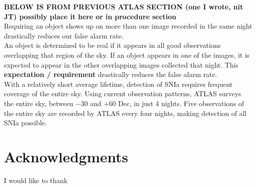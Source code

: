 \documentclass[aps,prb,twocolumn,superscriptaddress]{revtex4-1}
\begin{document}
{\bf \noindent BELOW IS FROM PREVIOUS ATLAS SECTION (one I wrote, nit JT)
\indent possibly place it here or in procedure section}\\
Requiring an object shows up on more than one image recorded in the same night 
drastically reduces our false alarm rate.\\
An object is determined to be real if it appears in all good 
observations overlapping that region of the sky. 
If an object appears in one of the images, it is expected to appear 
in the other overlapping images collected that night.
This {\bf expectation / requirement} drastically reduces the false alarm rate.\\
\indent With a relatively short average lifetime, detection of SNIa requires 
frequent coverage of the entire sky. Using current observation patterns,
ATLAS surveys the entire sky, between $-30$ and $+60$ Dec, in just 4 nights. 
Five observations of the entire sky are recorded by ATLAS every four nights, 
making detection of all SNIa possible.




\section*{Acknowledgments}
I would like to thank   %
\end{document}
